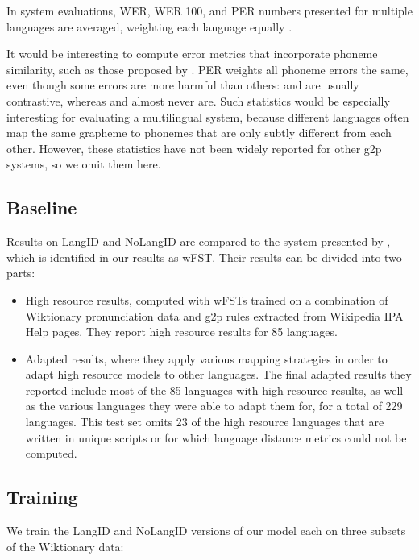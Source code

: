 \documentclass[11pt,letterpaper]{article}
\begin{document}
In system evaluations,  WER, WER 100, and PER numbers presented for multiple languages are averaged, weighting each language equally \citep[following][]{deri2016grapheme}.

It would be interesting to compute error metrics that incorporate phoneme similarity, such as those proposed by . PER weights all phoneme errors the same, even though some errors are more harmful than others:  and  are usually contrastive, whereas  and \textipa{/\|[d/} almost never are. Such statistics would be especially interesting for evaluating a multilingual system, because different languages often map the same grapheme to phonemes that are only subtly different from each other. However, these statistics have not been widely reported for other g2p systems, so we omit them here.

\subsection{Baseline}
Results on LangID and NoLangID are compared to the system presented by , which is identified in our results as wFST. Their results can be divided into two parts:

\begin{itemize}
\item High resource results, computed with wFSTs trained on a combination of Wiktionary pronunciation data and g2p rules extracted from Wikipedia IPA Help pages. They report high resource results for 85 languages.
\item Adapted results, where they apply various mapping strategies in order to adapt high resource models to other languages. The final adapted results they reported include most of the 85 languages with high resource results, as well as the various languages they were able to adapt them for, for a total of 229 languages. This test set omits 23 of the high resource languages that are written in unique scripts or for which language distance metrics could not be computed.
\end{itemize}

\subsection{Training}
We train the LangID and NoLangID versions of our model each on three subsets of the Wiktionary data:
\end{document}

